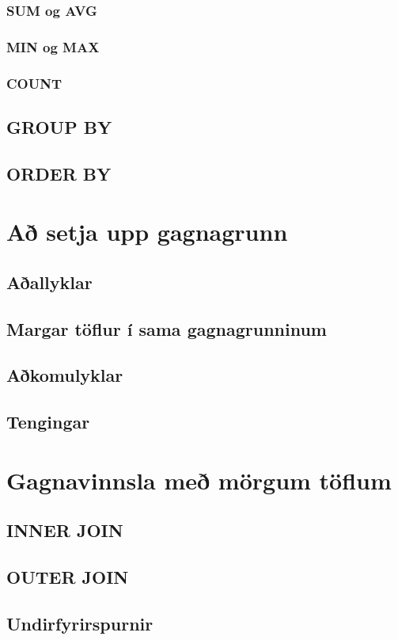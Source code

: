 \documentclass[nohyper,notoc,justified]{tufte-book}
\begin{document}
\subsection{SUM og AVG}
\subsection{MIN og MAX}
\subsection{COUNT}
\section{GROUP BY}
\section{ORDER BY}

\chapter{Að setja upp gagnagrunn}
\section{Aðallyklar} %
\section{Margar töflur í sama gagnagrunninum}
\section{Aðkomulyklar} %
\section{Tengingar} %

\chapter{Gagnavinnsla með mörgum töflum}
\section{INNER JOIN}
\section{OUTER JOIN}
\section{Undirfyrirspurnir}
\end{document}
